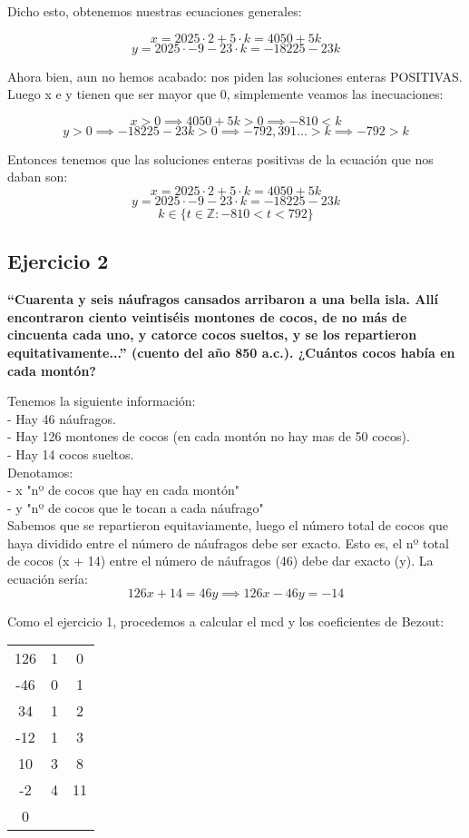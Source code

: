 \documentclass[11pt, a4paper, titlepage]{article}
\begin{document}
Dicho esto, obtenemos nuestras ecuaciones generales:

$$ x = 2025 \cdot 2 + 5 \cdot k = 4050 + 5k $$
$$ y = 2025 \cdot -9 - 23 \cdot k = -18225 - 23k $$

Ahora bien, aun no hemos acabado: nos piden las soluciones enteras POSITIVAS. Luego x e y tienen que ser mayor que 0, simplemente veamos las inecuaciones:

$$ x > 0 \implies 4050 + 5k > 0 \implies -810 < k$$
$$ y > 0 \implies -18225 - 23k > 0 \implies -792,391... > k \implies -792 > k $$

Entonces tenemos que las soluciones enteras positivas de la ecuación que nos daban son:
$$ x = 2025 \cdot 2 + 5 \cdot k = 4050 + 5k $$
$$ y = 2025 \cdot -9 - 23 \cdot k = -18225 - 23k $$
$$ k \in \{ t \in \mathbb{Z} : -810 < t < 792 \} $$

\subsection{\LARGE{Ejercicio 2}}

\textbf{“Cuarenta y seis náufragos cansados arribaron a una bella isla. Allí
encontraron ciento veintiséis montones de cocos, de no más de cincuenta cada uno,
y catorce cocos sueltos, y se los repartieron equitativamente...” (cuento del año
850 a.c.). ¿Cuántos cocos había en cada montón?}

Tenemos la siguiente información: \\
- Hay 46 náufragos. \\
- Hay 126 montones de cocos (en cada montón no hay mas de 50 cocos). \\
- Hay 14 cocos sueltos. \\

Denotamos: \\
- x \equiv "nº de cocos que hay en cada montón" \\
- y \equiv "nº de cocos que le tocan a cada náufrago" \\

Sabemos que se repartieron equitaviamente, luego el número total de cocos que haya dividido entre el número de náufragos debe ser exacto. Esto es, el nº total de cocos (x  + 14) entre el número de náufragos (46) debe dar exacto (y). La ecuación sería:
$$ 126x + 14 = 46y \implies 126x - 46y = -14 $$

Como el ejercicio 1, procedemos a calcular el mcd y los coeficientes de Bezout:

\begin{center}
\begin{tabular}{c|cc}
126 & 1 & 0 \\
-46 & 0 & 1 \\
\hline
34 & 1 & 2 \\
\hline
-12 & 1 & 3 \\
\hline
10 & 3 & 8 \\
\hline
-2 & 4 & 11 \\
\hline
0
\end{tabular}
\end{center}
\end{document}
